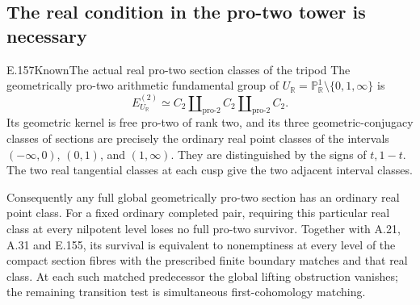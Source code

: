 \subsection{The real condition in the pro-two tower is necessary}

\begin{result}{E.157}{Known}{The actual real pro-two section classes of the tripod}
The geometrically pro-two arithmetic fundamental group of
\(U_{\mathbb R}=\mathbb P^1_{\mathbb R}\setminus\{0,1,\infty\}\)
is
\[
 E^{(2)}_{U_{\mathbb R}}\simeq
 C_2\amalg_{\mathrm{pro}\text{-}2}
 C_2\amalg_{\mathrm{pro}\text{-}2}C_2.
 \tag{E.157.1}
\]
Its geometric kernel is free pro-two of rank two, and its
three geometric-conjugacy classes of sections are precisely
the ordinary real point classes of the intervals
\((-\infty,0)\), \((0,1)\), and \((1,\infty)\).
They are distinguished by the signs of \(t,1-t\).
The two real tangential classes at each cusp give the two
adjacent interval classes.

Consequently any full global geometrically pro-two section
has an ordinary real point class. For a fixed ordinary
completed pair, requiring this particular real class at
every nilpotent level loses no full pro-two survivor.
Together with A.21, A.31 and E.155, its survival is equivalent
to nonemptiness at every level of the compact section fibres
with the prescribed finite boundary matches and that real
class. At each such matched predecessor the global lifting
obstruction vanishes; the remaining transition test is
simultaneous first-cohomology matching.
\end{result}
